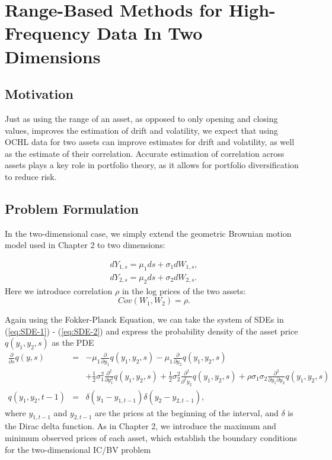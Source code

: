 \chapter{Range-Based Methods for High-Frequency Data In Two Dimensions} \label{chapter:3}

\section{Motivation}
Just as using the range of an asset, as opposed to only opening and closing values, improves the estimation of drift and volatility, we expect that using OCHL data for two assets can improve estimates for drift and volatility, as well as the estimate of their correlation. Accurate estimation of correlation across assets plays a key role in portfolio theory, as it allows for portfolio diversification to reduce risk. 

\section{Problem Formulation}
In the two-dimensional case, we simply extend the geometric Brownian motion model used in Chapter 2 to two dimensions:

\begin{eqnarray}
	dY_{1,s} = \mu_1 ds + \sigma_1 dW_{1,s}, \\ \label{eq:SDE-1}
	dY_{2,s} = \mu_2 ds + \sigma_2 dW_{2,s}. \label{eq:SDE-2}
\end{eqnarray}
Here we introduce correlation $\rho$ in the log prices of the two assets:
\[ Cov(W_1, W_2) = \rho. \]

Again using the Fokker-Planck Equation, we can take the system of SDEs in (\ref{eq:SDE-1}) - (\ref{eq:SDE-2}) and express the probability density of the asset price $q(y_1, y_2,s)$ as the PDE
\begin{eqnarray}
	\frac{\partial}{\partial s} q(y,s) &=& -\mu_1 \frac{\partial}{\partial y_1}q(y_1, y_2,s) -\mu_1 \frac{\partial}{\partial y_2}q(y_1, y_2,s) \nonumber \\
		&&  + \frac{1}{2}\sigma_1^2 \frac{\partial^2}{\partial y_1^2} q(y_1, y_2,s) + \frac{1}{2} \sigma_2^2 \frac{\partial^2}{\partial^2 y_2}q(y_1,y_2,s) + \rho \sigma_1 \sigma_2 \frac{\partial^2}{\partial y_1 \partial y_2} q(y_1, y_2, s) \label{eq:ch3-IV-1} \\
	q(y_1, y_2, t-1) &=& \delta(y_1-y_{1,t-1})\delta(y_2-y_{2,t-1}), \label{eq:ch3-IV-2}
\end{eqnarray}
where $y_{1,t-1}$ and $y_{2,t-1}$ are the prices at the beginning of the interval, and $\delta$ is the Dirac delta function. As in Chapter 2, we introduce the maximum and minimum observed prices of each asset, which establish the boundary conditions for the two-dimensional IC/BV problem

